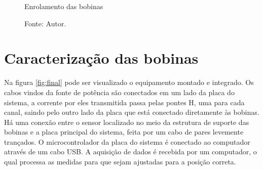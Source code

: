 \begin{figure}[H]
    \centering
     \caption{Enrolamento das bobinas}
     \caption*{Fonte: Autor.}\label{fig:morsa}
\end{figure}


\section{Caracterização das bobinas}

Na figura \ref{fig:final} pode ser visualizado o equipamento montado e integrado. Os cabos vindos da fonte de potência são conectados em um lado da placa do sistema, a corrente por eles transmitida passa pelas pontes H, uma para cada canal, saindo pelo outro lado da placa que está conectado diretamente às bobinas. Há uma conexão entre o sensor localizado no meio da estrutura de suporte das bobinas e a placa principal do sistema, feita por um cabo de pares levemente trançados. O microcontrolador da placa do sistema é conectado ao computador através de um cabo USB. A aquisição de dados é recebida por um computador, o qual processa as medidas para que sejam ajustadas para a posição correta.


